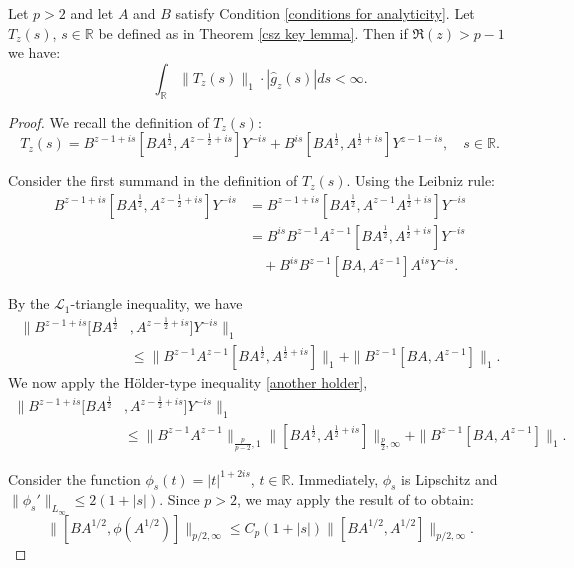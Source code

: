     \begin{lem}\label{integrability lemma} 
        Let $p>2$ and let $A$ and $B$ satisfy Condition \ref{conditions for analyticity}. Let $T_z(s)$, $s \in \mathbb{R}$ be defined as in Theorem \ref{csz key lemma}. Then if $\Re(z) > p-1$ we have:
        $$\int_{\mathbb{R}}\|T_z(s)\|_1\cdot |\hat{g}_z(s)|ds<\infty.$$
    \end{lem}
    \begin{proof} 
        We recall the definition of $T_z(s)$:
        $$T_z(s)= B^{z-1+is}[BA^{\frac{1}{2}},A^{z-\frac{1}{2}+is}]Y^{-is}+B^{is}[BA^{\frac{1}{2}},A^{\frac{1}{2}+is}]Y^{z-1-is},\quad s\in\mathbb{R}.$$
                
        Consider the first summand in the definition of $T_z(s)$. Using the Leibniz rule:
        \begin{align*}
            B^{z-1+is}[BA^{\frac12},A^{z-\frac12+is}]Y^{-is} &= B^{z-1+is}[BA^{\frac12},A^{z-1} A^{\frac12+is}]Y^{-is}\\
                                                             &= B^{is} B^{z-1}A^{z-1}[BA^{\frac12},A^{\frac12+is}] Y^{-is}\\
                                                             &\quad+B^{is} B^{z-1}[BA,A^{z-1}] A^{is}Y^{-is}.
        \end{align*}
        
        By the $\mathcal{L}_1$-triangle inequality, we have
        \begin{align*}
            \|B^{z-1+is}[BA^{\frac12}&,A^{z-\frac12+is}]Y^{-is}\|_1\\
                                     &\leq \|B^{z-1}A^{z-1}[BA^{\frac12},A^{\frac12+is}]\|_1+\|B^{z-1}[BA,A^{z-1}]\|_1.
        \end{align*}
        We now apply the H\"older-type inequality \eqref{another holder},
        \begin{align}
            \|B^{z-1+is}[BA^{\frac12}&,A^{z-\frac12+is}]Y^{-is}\|_1\nonumber\\
                                     &\leq\|B^{z-1}A^{z-1}\|_{\frac{p}{p-2},1}\|[BA^{\frac12},A^{\frac12+is}]\|_{\frac{p}{2},\infty}+\|B^{z-1}[BA,A^{z-1}]\|_1.\label{first big holder estimate}
        \end{align}
        
        Consider the function $\phi_s(t) = |t|^{1+2is}$, $t \in \mathbb{R}$. Immediately, $\phi_s$ is Lipschitz and $\|\phi_s'\|_{L_\infty} \leq 2(1+|s|).$ Since $p > 2$, we may apply the result of \cite{PS-acta} to obtain:
        \begin{equation*}
            \|[BA^{1/2},\phi(A^{1/2})]\|_{p/2,\infty} \leq C_p(1+|s|)\|[BA^{1/2},A^{1/2}]\|_{p/2,\infty}.
        \end{equation*}
        

\end{proof}
